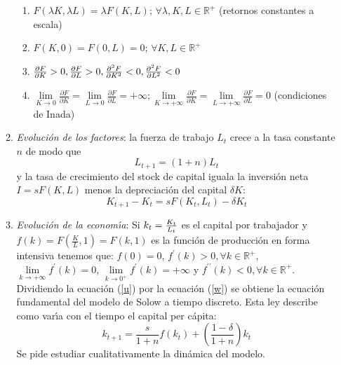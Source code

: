 \documentclass{article}
\begin{document}
\begin{enumerate}
\begin{enumerate}
\begin{enumerate}
\item $F\left( \lambda K,\lambda L\right) =\lambda F\left( K,L\right) $; $%
\forall \lambda ,K,L\in 
\mathbb{R}
^{+}$ (retornos constantes a escala)

\item $F\left( K,0\right) =F\left( 0,L\right) =0$; $\forall K,L\in 
\mathbb{R}
^{+}$

\item $\frac{\partial F}{\partial K}>0,\frac{\partial F}{\partial L}>0,\frac{%
\partial ^{2}F}{\partial K^{2}}<0,\frac{\partial ^{2}F}{\partial L^{2}}<0$

\item $\lim\limits_{K\rightarrow 0}\frac{\partial F}{\partial K}%
=\lim\limits_{L\rightarrow 0}\frac{\partial F}{\partial L}=+\infty
;\lim\limits_{K\rightarrow +\infty }\frac{\partial F}{\partial K}%
=\lim\limits_{L\rightarrow +\infty }\frac{\partial F}{\partial L}=0$
(condiciones de Inada)
\end{enumerate}

\item \textit{Evoluci\'{o}n de los factores}: la fuerza de trabajo $L_{t}$
crece a la tasa constante $n$ de modo que%
\begin{equation}
L_{t+1}=\left( 1+n\right) L_{t}  \label{w}
\end{equation}%
y la tasa de crecimiento del stock de capital iguala la inversi\'{o}n neta $%
I=sF\left( K,L\right) $ menos la depreciaci\'{o}n del capital $\delta K:$%
\begin{equation}
K_{t+1}-K_{t}=sF\left( K_{t},L_{t}\right) -\delta K_{t}  \label{u}
\end{equation}

\item \textit{Evoluci\'{o}n de la econom\'{\i}a}: Si $k_{t}=\frac{K_{t}}{%
L_{t}}$ es el capital por trabajador y $f(k)=F\left( \frac{K}{L},1\right)
=F\left( k,1\right) $ es la funci\'{o}n de producci\'{o}n en forma intensiva
tenemos que: $f(0)=0$, $f^{\prime }(k)>0,\forall k\in 
\mathbb{R}
^{+}$, $\lim\limits_{k\rightarrow +\infty }f^{\prime }(k)=0$, $%
\lim\limits_{k\rightarrow 0^{+}}f^{\prime }(k)=+\infty $ y $f^{\prime \prime
}(k)<0,\forall k\in 
\mathbb{R}
^{+}$. Dividiendo la ecuaci\'{o}n (\ref{u}) por la ecuaci\'{o}n (\ref{w}) se
obtiene la ecuaci\'{o}n fundamental del modelo de Solow a tiempo discreto.
Esta ley describe como var\'{\i}a con el tiempo el capital per c\'{a}pita:%
\begin{equation*}
k_{t+1}=\frac{s}{1+n}f(k_{t})+\left( \frac{1-\delta }{1+n}\right) k_{t}
\end{equation*}%
Se pide estudiar cualitativamente la din\'{a}mica del modelo.
\end{enumerate}
\end{enumerate}
\end{document}
